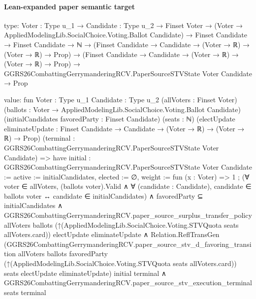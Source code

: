 \documentclass[10pt]{article}
\begin{document}
\paragraph{Lean-expanded paper semantic target}
\begin{ReviewVerbatim}
type:
{Voter : Type u_1} →
  {Candidate : Type u_2} →
    Finset Voter →
      (Voter → AppliedModelingLib.SocialChoice.Voting.Ballot Candidate) →
        Finset Candidate →
          Finset Candidate →
            ℕ →
              (Finset Candidate → Candidate → (Voter → ℝ) → (Voter → ℝ) → Prop) →
                (Finset Candidate → Candidate → (Voter → ℝ) → (Voter → ℝ) → Prop) →
                  GGRS26CombattingGerrymanderingRCV.PaperSourceSTVState Voter Candidate → Prop

value:
fun {Voter : Type u_1} {Candidate : Type u_2} (allVoters : Finset Voter)
    (ballots : Voter → AppliedModelingLib.SocialChoice.Voting.Ballot Candidate)
    (initialCandidates favoredParty : Finset Candidate) (seats : ℕ)
    (electUpdate eliminateUpdate : Finset Candidate → Candidate → (Voter → ℝ) → (Voter → ℝ) → Prop)
    (terminal : GGRS26CombattingGerrymanderingRCV.PaperSourceSTVState Voter Candidate) =>
  have initial : GGRS26CombattingGerrymanderingRCV.PaperSourceSTVState Voter Candidate :=
    { active := initialCandidates, elected := ∅, weight := fun (x : Voter) => 1 };
  (∀ voter ∈ allVoters,
      (ballots voter).Valid ∧ ∀ (candidate : Candidate), candidate ∈ ballots voter ↔ candidate ∈ initialCandidates) ∧
    favoredParty ⊆ initialCandidates ∧
      GGRS26CombattingGerrymanderingRCV.paper_source_surplus_transfer_policy allVoters ballots
          (↑(AppliedModelingLib.SocialChoice.Voting.STVQuota seats allVoters.card)) electUpdate eliminateUpdate ∧
        Relation.ReflTransGen
            (GGRS26CombattingGerrymanderingRCV.paper_source_stv_d_favoring_transition allVoters ballots favoredParty
              (↑(AppliedModelingLib.SocialChoice.Voting.STVQuota seats allVoters.card)) seats electUpdate
              eliminateUpdate)
            initial terminal ∧
          GGRS26CombattingGerrymanderingRCV.paper_source_stv_execution_terminal seats terminal
\end{ReviewVerbatim}
\end{document}
